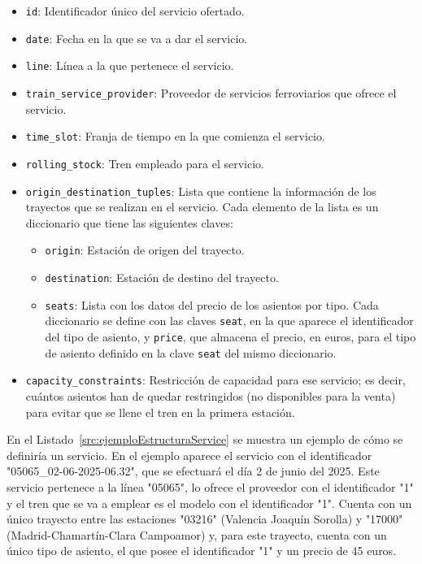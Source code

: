 \begin{itemize}
    \item \texttt{id}: Identificador único del servicio ofertado.
    \item \texttt{date}: Fecha en la que se va a dar el servicio.
    \item \texttt{line}: Línea a la que pertenece el servicio.
    \item \texttt{train\_service\_provider}: Proveedor de servicios ferroviarios que ofrece el servicio.
    \item \texttt{time\_slot}: Franja de tiempo en la que comienza el servicio.
    \item \texttt{rolling\_stock}: Tren empleado para el servicio.
    \item \texttt{origin\_destination\_tuples}: Lista que contiene la información de los trayectos que se realizan en el servicio. Cada elemento de la lista es un diccionario que tiene las siguientes claves:
        \begin{itemize}
            \item \texttt{origin}: Estación de origen del trayecto.
            \item \texttt{destination}: Estación de destino del trayecto.
            \item \texttt{seats}: Lista con los datos del precio de los asientos por tipo. Cada diccionario se define con las claves \texttt{seat}, en la que aparece el identificador del tipo de asiento, y \texttt{price}, que almacena el precio, en euros, para el tipo de asiento definido en la clave \texttt{seat} del mismo diccionario.
        \end{itemize}
    \item \texttt{capacity\_constraints}: Restricción de capacidad para ese servicio; es decir, cuántos asientos han de quedar restringidos (no disponibles para la venta) para evitar que se llene el tren en la primera estación.
\end{itemize}

En el Listado~\ref{src:ejemploEstructuraService} se muestra un ejemplo de cómo se definiría un servicio. En el ejemplo aparece el servicio con el identificador "05065\_02-06-2025-06.32", que se efectuará el día 2 de junio del 2025. Este servicio pertenece a la línea "05065", lo ofrece el proveedor con el identificador "1" y el tren que se va a emplear es el modelo con el identificador "1". Cuenta con un único trayecto entre las estaciones "03216" (Valencia Joaquín Sorolla) y "17000" (Madrid-Chamartín-Clara Campoamor) y, para este trayecto, cuenta con un único tipo de asiento, el que posee el identificador "1" y un precio de 45 euros.

